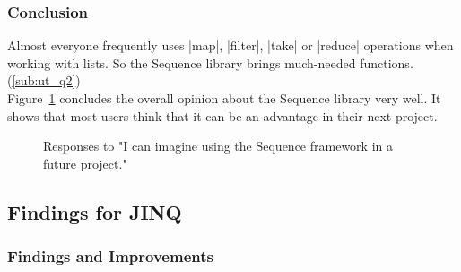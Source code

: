\subsubsection{Conclusion} %
\label{subsub:usertesting_conlusion}
Almost everyone frequently uses |map|, |filter|, |take| or |reduce| operations
when working with lists. So the Sequence library brings much-needed functions.
(\ref{sub:ut_q2}) \\ 
Figure~\ref{fig:usertest_q1} concludes the overall opinion about the Sequence
library very well. It shows that most users think that it can be an
advantage in their next project.
\begin{figure}[H]
  \centering
{}
\caption{Responses to "I can imagine using the Sequence framework in a future project."}
\label{fig:usertest_q1}
\end{figure}
\subsection{Findings for JINQ} %
\label{sub:Findings for JINQ}
\subsubsection{Findings and Improvements} %
\label{subsub:jinq_finding_and_imrpovements}

